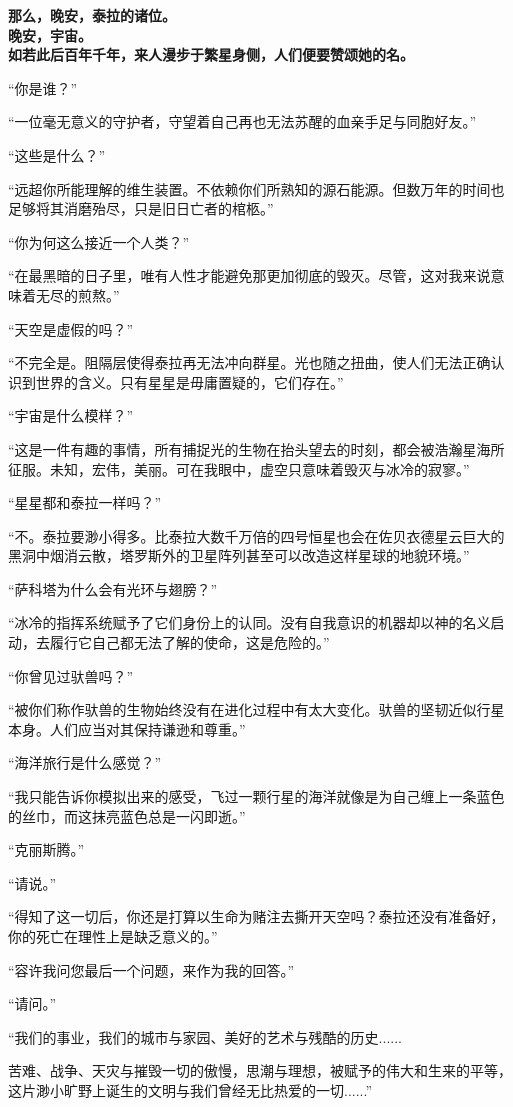 \documentclass[openany]{book}
\begin{document}
\begin{center} \textbf{那么，晚安，泰拉的诸位。\\晚安，宇宙。\\如若此后百年千年，来人漫步于繁星身侧，人们便要赞颂她的名。}\end{center}\par

“你是谁？”\par
“一位毫无意义的守护者，守望着自己再也无法苏醒的血亲手足与同胞好友。”\par
“这些是什么？”\par
“远超你所能理解的维生装置。不依赖你们所熟知的源石能源。但数万年的时间也足够将其消磨殆尽，只是旧日亡者的棺柩。”\par
“你为何这么接近一个人类？”\par
“在最黑暗的日子里，唯有人性才能避免那更加彻底的毁灭。尽管，这对我来说意味着无尽的煎熬。”\par
“天空是虚假的吗？”\par
“不完全是。阻隔层使得泰拉再无法冲向群星。光也随之扭曲，使人们无法正确认识到世界的含义。只有星星是毋庸置疑的，它们存在。”\par
“宇宙是什么模样？”\par
“这是一件有趣的事情，所有捕捉光的生物在抬头望去的时刻，都会被浩瀚星海所征服。未知，宏伟，美丽。可在我眼中，虚空只意味着毁灭与冰冷的寂寥。”\par
“星星都和泰拉一样吗？”\par
“不。泰拉要渺小得多。比泰拉大数千万倍的四号恒星也会在佐贝衣德星云巨大的黑洞中烟消云散，塔罗斯外的卫星阵列甚至可以改造这样星球的地貌环境。”\par
“萨科塔为什么会有光环与翅膀？”\par
“冰冷的指挥系统赋予了它们身份上的认同。没有自我意识的机器却以神的名义启动，去履行它自己都无法了解的使命，这是危险的。”\par
“你曾见过驮兽吗？”\par
“被你们称作驮兽的生物始终没有在进化过程中有太大变化。驮兽的坚韧近似行星本身。人们应当对其保持谦逊和尊重。”\par
“海洋旅行是什么感觉？”\par
“我只能告诉你模拟出来的感受，飞过一颗行星的海洋就像是为自己缠上一条蓝色的丝巾，而这抹亮蓝色总是一闪即逝。”\par
“克丽斯腾。”\par
“请说。”\par
“得知了这一切后，你还是打算以生命为赌注去撕开天空吗？泰拉还没有准备好，你的死亡在理性上是缺乏意义的。”\par
“容许我问您最后一个问题，来作为我的回答。”\par
“请问。”\par
“我们的事业，我们的城市与家园、美好的艺术与残酷的历史......\par
苦难、战争、天灾与摧毁一切的傲慢，思潮与理想，被赋予的伟大和生来的平等，这片渺小旷野上诞生的文明与我们曾经无比热爱的一切......”\par
\end{document}
